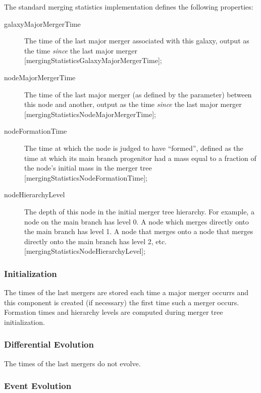 The standard merging statistics implementation defines the following properties:
\begin{description}
 \item [{\normalfont \ttfamily galaxyMajorMergerTime}] The time of the last major merger associated with this galaxy, output as the time \emph{since} the last major merger [{\normalfont \ttfamily mergingStatisticsGalaxyMajorMergerTime}];
 \item [{\normalfont \ttfamily nodeMajorMergerTime}] The time of the last major merger (as defined by the {\normalfont \ttfamily [nodeMajorMergerFraction]} parameter) between this \gls{node} and another, output as the time \emph{since} the last major merger [{\normalfont \ttfamily mergingStatisticsNodeMajorMergerTime}];
 \item [{\normalfont \ttfamily nodeFormationTime}] The time at which the \gls{node} is judged to have ``formed'', defined as the time at which its main branch progenitor had a mass equal to a fraction {\normalfont \ttfamily [nodeFormationMassFraction]} of the node's initial mass in the merger tree [{\normalfont \ttfamily mergingStatisticsNodeFormationTime}];
 \item [{\normalfont \ttfamily nodeHierarchyLevel}] The depth of this node in the initial merger tree hierarchy. For example, a node on the main branch has level 0. A node which merges directly onto the main branch has level 1. A node that merges onto a node that merges directly onto the main branch has level 2, etc. [{\normalfont \ttfamily mergingStatisticsNodeHierarchyLevel}];
\end{description}

\subsubsection{Initialization}

The times of the last mergers are stored each time a major merger occurrs and this \gls{component} is created (if necessary) the first time such a merger occurs. Formation times and hierarchy levels are computed during merger tree initialization.

\subsubsection{Differential Evolution}

The times of the last mergers do not evolve.

\subsubsection{Event Evolution}

